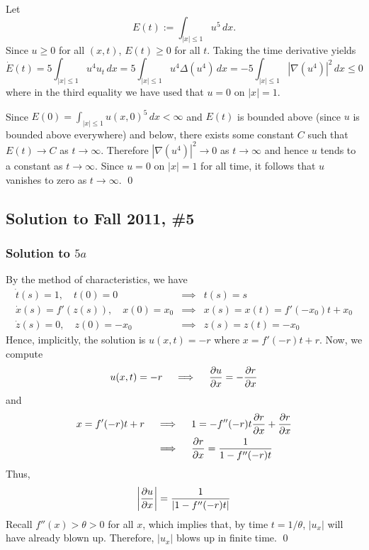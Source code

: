 Let $$E(t) := \int_{|x| \leq 1} u^{5}\, dx.$$ Since $u \geq 0$ for all $(x, t)$, $E(t) \geq 0$ for all $t$. Taking the time derivative yields
$$\dot{E}(t) = 5\int_{|x| \leq 1}u^{4}u_{t}\, dx = 5\int_{|x| \leq 1}u^{4}\Delta (u^{4})\, dx = -5\int_{|x| \leq 1}|\nabla(u^{4})|^{2}\, dx \leq 0$$
where in the third equality we have used that $u = 0$ on $|x| = 1$.

Since $E(0) = \int_{|x| \leq 1}u(x, 0)^{5}\, dx < \infty$
and $E(t)$ is bounded above (since $u$ is bounded above everywhere) and below, there exists some constant $C$ such that $E(t) \rightarrow C$ as $t \rightarrow \infty$.
Therefore $|\nabla(u^{4})|^{2} \rightarrow 0$ as $t \rightarrow \infty$
and hence $u$ tends to a constant as $t \rightarrow \infty$. Since $u = 0$ on $|x| = 1$ for all time, it follows that $u$ vanishes to zero as $t \rightarrow \infty$. \hfill \qed



\subsection*{Solution to Fall 2011, \#5}
\label{F11Q5}

\subsubsection*{Solution to $5a$}

By the method of characteristics, we have
$$
\begin{array}{lll}
\dot{t}(s) = 1, \quad t(0) = 0 & \implies & t(s) = s \\
\dot{x}(s) = f'(z(s)), \quad x(0) = x_0 & \implies & x(s) = x(t) = f'(-x_0)t + x_0 \\
\dot{z}(s) = 0, \quad z(0) = -x_0 & \implies & z(s) = z(t) = -x_0
\end{array}
$$
Hence, implicitly, the solution is $u(x,t) = -r$ where $x = f'(-r)t + r$. Now, we compute
$$ u(x,t) = -r \quad \implies \quad \frac{\partial u}{\partial x} = -\frac{\partial r}{\partial x} $$
and
\begin{align*}
x = f'(-r)t + r \quad &\implies \quad 1 = - f''(-r) t \frac{\partial r}{\partial x} + \frac{\partial r}{\partial x} \\
&\implies \quad \frac{\partial r}{\partial x} = \frac{1}{1-f''(-r)t}
\end{align*}
Thus,
$$ \left| \frac{\partial u}{\partial x} \right| = \frac{1}{|1-f''(-r)t|} $$
Recall $f''(x) > \theta > 0$ for all $x$, which implies that, by time $t = 1/\theta$, $|u_x|$ will have already blown up. Therefore, $|u_x|$ blows up in finite time. \hfill \qed

